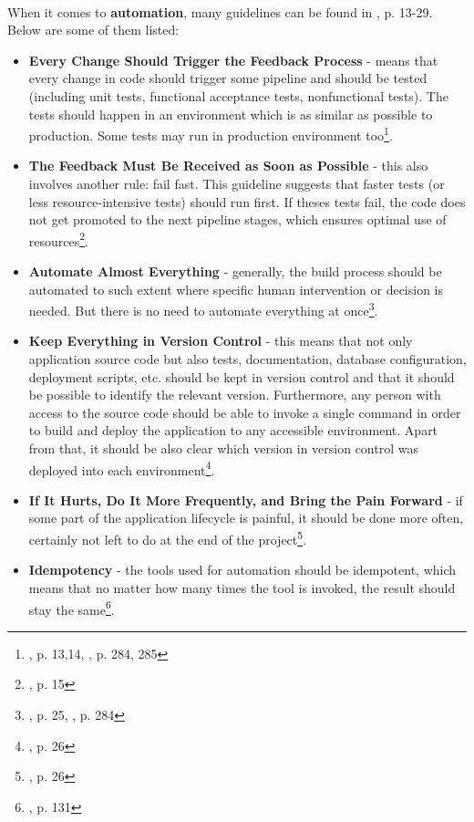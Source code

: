 \paragraph{}
When it comes to \textbf{automation}, many guidelines can be found in \cite{book-cicd}, p. 13-29. Below are some of them listed:
\begin{itemize}
\item \textbf{Every Change Should Trigger the Feedback Process} - means that every change in code should trigger some pipeline and should be tested (including unit tests, functional acceptance tests, nonfunctional tests). The tests should happen in an environment which is as similar as possible to production. Some tests may run in production environment too\footnote{\cite{book-cicd}, p. 13,14, \cite{book-iac}, p. 284, 285}.
\item \textbf{The Feedback Must Be Received as Soon as Possible} - this also involves another rule: fail fast. This guideline suggests that faster tests (or less resource-intensive tests) should run first. If theses tests fail, the code does not get promoted to the next pipeline stages, which ensures optimal use of resources\footnote{\cite{book-cicd}, p. 15}.
\item \textbf{Automate Almost Everything} - generally, the build process should be automated to such extent where specific human intervention or decision is needed. But there is no need to automate everything at once\footnote{\cite{book-cicd}, p. 25, \cite{book-iac}, p. 284}.
\item \textbf{Keep Everything in Version Control} - this means that not only application source code but also tests, documentation, database configuration, deployment scripts, etc. should be kept in version control and that it should be possible to identify the relevant version. Furthermore, any person with access to the source code should be able to invoke a single command in order to build and deploy the application to any accessible environment. Apart from that, it should be also clear which version in version control was deployed into each environment\footnote{\cite{book-cicd}, p. 26}.
\item \textbf{If It Hurts, Do It More Frequently, and Bring the Pain Forward} - if some part of the application lifecycle is painful, it should be done more often, certainly not left to do at the end of the project\footnote{\cite{book-cicd}, p. 26}.
\item \textbf{Idempotency} - the tools used for automation should be idempotent, which means that no matter how many times the tool is invoked, the result should stay the same\footnote{\cite{book-iac}, p. 131}.
\end{itemize}

